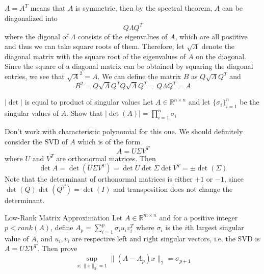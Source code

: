 \documentclass[../main]{subfiles}
\begin{document}
\begin{solution}
    $A=A^T$ means that $A$ is symmetric, then by the spectral theorem, $A$ can be diagonalized into 
    \[
    Q \Lambda Q^T
    \]
    where the digonal of $\Lambda$ consists of the eigenvalues of $A$, which are all posiitive and thus we can take square roots of them. Therefore, let $\sqrt{\Lambda}$ denote the diagonal matrix with the square root of the eigenvalues of $A$ on the diagonal. Since the square of a diagonal matrix can be obtained by squaring the diagonal entries, we see that $\sqrt{A}^2 = A$. We can define the matrix $B$ as $Q\sqrt{\Lambda}Q^T$ and 
    \[
    B^2 = Q\sqrt{\Lambda}Q^TQ\sqrt{\Lambda}Q^T = Q\Lambda Q^T = A
    \]
\end{solution}
\begin{bbox}{$|\det|$ is equal to product of singular values}
    Let $A\in \mathbb R^{n\times n}$ and let $\{\sigma_i\}_{i=1}^n$ be the singular values of $A$. Show that $|\det(A)| = \prod_{i=1}^n \sigma_i$ 
\end{bbox}
\begin{solution}
    Don't work with characteristic polynomial for this one. We should definitely consider the SVD of $A$ which is of the form
    \[
    A = U\Sigma V^T
    \]
    where $U$ and $V^T$ are orthonormal matrices. Then
    \[
    \det A = \det(U\Sigma V^T) = \det U \det \Sigma \det V^T = \pm \det (\Sigma)
    \]
    Note that the determinant of orthonormal matrices is either $+1$ or $-1$, since $\det (Q)\det(Q^T) = \det(I)$ and transposition does not change the determinant.
\end{solution}
\begin{bbox}{Low-Rank Matrix Approximation}
    Let $A\in \mathbb R^{m \times n}$ and for a positive integer $p < rank(A)$, define $A_p = \sum_{i=1}^p \sigma_i u_i v_i^T$ where $\sigma_i$ is the $i$th largest singular value of $A$, and $u_i, v_i$ are respective left and right singular vectors, i.e. the SVD is $A = U\Sigma V^T$. Then prove
    \[
    \sup_{x:\|x\|_2 = 1} \|(A-A_p)x\|_2 = \sigma_{p+1}
    \]
\end{bbox}
\end{document}
